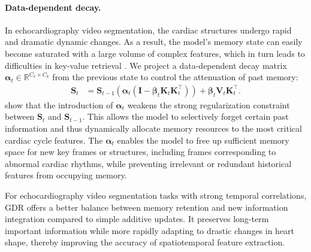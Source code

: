 \paragraph{Data-dependent decay.}
In echocardiography video segmentation, the cardiac structures undergo rapid and dramatic dynamic changes. As a result, the model's memory state can easily become saturated with a large volume of complex features, which in turn leads to difficulties in key-value retrieval \cite{yang2025gated,dao2024transformersssmsgeneralizedmodels}.
We project a data-dependent decay matrix $\boldsymbol{\alpha}_t \in \mathbb{R}^{C_v \times C_k}$ from the previous state to control the attenuation of past memory: 
\begin{equation}
    \begin{aligned}
		\mathbf{S}_{t} 	&= 	  \mathbf{S}_{t-1} \left( \boldsymbol{\alpha}_t \left( \mathbf{I} - \boldsymbol{\beta}_t \boldsymbol{K}_t \boldsymbol{K}_t^{\intercal} \right) \right) + \boldsymbol{\beta}_t  \boldsymbol{V}_t \boldsymbol{K}_t^{\intercal}. 
    \end{aligned}
    \label{eq:Gated_Delta_Rule}
\end{equation}
 show that the introduction of $\boldsymbol{\alpha}_t$ weakens the strong regularization constraint between $\mathbf{S}_t$ and $\mathbf{S}_{t-1}$. This allows the model to selectively forget certain past information and thus dynamically allocate memory resources to the most critical cardiac cycle features.
The $\boldsymbol{\alpha}_t$ enables the model to free up sufficient memory space for new key frames or structures, including frames corresponding to abnormal cardiac rhythms, while preventing irrelevant or redundant historical features from occupying memory.

For echocardiography video segmentation tasks with strong temporal correlations, GDR offers a better balance between memory retention and new information integration compared to simple additive updates. It preserves long-term important information while more rapidly adapting to drastic changes in heart shape, thereby improving the accuracy of spatiotemporal feature extraction. 
